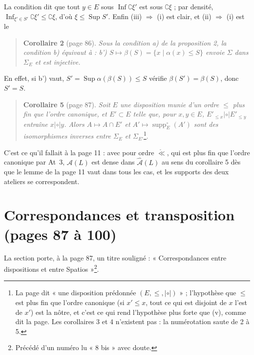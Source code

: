 \documentclass[11pt,a4paper]{article}
\begin{document}
La condition dit que tout $y \in E$ sous $\operatorname{Inf}\complement
\xi'$ est sous $\complement\xi$ ; par densité, $\operatorname{Inf}_{\xi' \in S'}
\complement\xi' \leq \complement\xi$, d'où $\xi \leq \operatorname{Sup}S'$. Enfin
(iii) $\Rightarrow$ (i) est clair, et (ii) $\Rightarrow$ (i) est le

\begin{quote}
\textbf{Corollaire 2} (page 86). \emph{Sous la condition a) de la proposition 2,
la condition b) équivaut à : b') $S \mapsto \beta(S) = \{x \mid \alpha(x) \leq
S\}$ envoie $\Sigma$ dans $\Sigma_{E}$ et est injective.}
\end{quote}

En effet, si b') vaut, $S' = \operatorname{Sup}\alpha(\beta(S)) \leq S$
vérifie $\beta(S') = \beta(S)$, donc $S' = S$.

\begin{quote}
\textbf{Corollaire 5} (page 87). \emph{Soit $E$ une disposition munie d'un ordre
$\leq$ plus fin que l'ordre canonique, et $E' \subset E$ telle que, pour $x, y
\in E$, $E'_{\leq x} \mathrel{|\circ|} E'_{\leq y}$ entraîne $x \mathrel{|\circ|}
y$. Alors $A \mapsto A \cap E'$ et $A' \mapsto \operatorname{supp}^{\circ}_{E}(A')$
sont des isomorphismes inverses entre $\Sigma_{E}$ et $\Sigma_{E'}$}\footnote{La
page dit « une disposition prédonnée $(E, \leq, \mathrel{|\circ|})$ » ; l'hypothèse
que $\leq$ est plus fin que l'ordre canonique (si $x' \leq x$, tout ce qui est
disjoint de $x$ l'est de $x'$) est la nôtre, et c'est ce qui rend l'hypothèse
plus forte que (v), comme dit la page. Les corollaires 3 et 4 n'existent pas :
la numérotation saute de 2 à 5.}.
\end{quote}

C'est ce qu'il fallait à la page 11 : avec pour ordre
$\mathrel{\mathring{\ll}}$, qui est plus fin que l'ordre canonique par At~3,
$\mathcal{A}(L)$ est dense dans $\widehat{\mathcal{A}}(L)$ au sens du corollaire
5 dès que le lemme de la page 11 vaut dans tous les cas, et les supports des deux
ateliers se correspondent.

\section*{Correspondances et transposition (pages 87 à 100)}

La section porte, à la page 87, un titre souligné : « Correspondances entre dispositions et entre Spatios »\footnote{Précédé d'un numéro lu « 8 bis » avec
doute.}.
\end{document}

